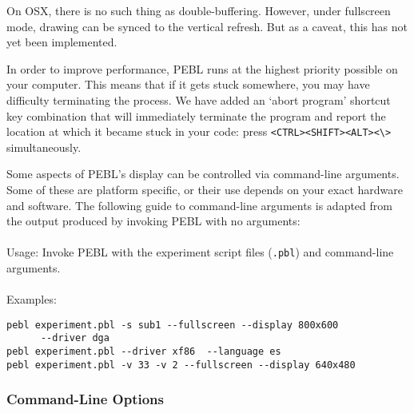 On OSX, there is no such thing as double-buffering.  However, under
fullscreen mode, drawing can be synced to the vertical refresh. But as
a caveat, this has not yet been implemented.


In order to improve performance, PEBL runs at the highest
priority possible on your computer.  This means that if it
gets stuck somewhere, you may have difficulty terminating the
process.  We have added an `abort program' shortcut key
combination that will immediately terminate the program and
report the location at which it became stuck in your code: \newline press \verb+<CTRL><SHIFT><ALT><\>+ simultaneously.
  

\label{sec:2.5}
Some aspects of PEBL's display can be controlled via
command-line arguments.  Some of these are platform
specific, or their use depends on your exact hardware and
software. The following guide to command-line
arguments is adapted from the output produced by
invoking PEBL  with no arguments:\\
\\
Usage:  Invoke PEBL with the experiment script files (\texttt{.pbl})
and  command-line arguments.\\
\\
Examples:
\begin{verbatim}
pebl experiment.pbl -s sub1 --fullscreen --display 800x600
      --driver dga
pebl experiment.pbl --driver xf86  --language es
pebl experiment.pbl -v 33 -v 2 --fullscreen --display 640x480 
\end{verbatim}
 

\subsubsection{Command-Line Options}

